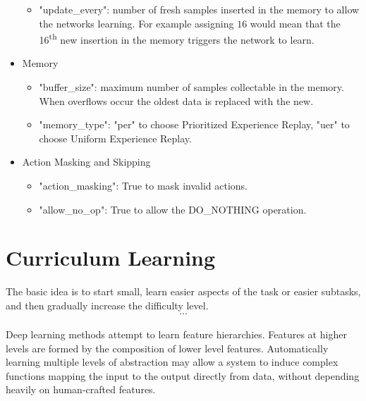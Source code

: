 \documentclass[11pt, a4paper, hidelinks]{report}
\begin{document}
\begin{itemize}
\begin{itemize}
		\item "update\_every": number of fresh samples inserted in the memory to allow the networks learning.
For example assigning $16$ would mean that the 16\textsuperscript{th} new insertion in the memory triggers the network to learn.
	\end{itemize}
	\item Memory
	\begin{itemize}
		\item "buffer\_size": maximum number of samples collectable in the memory.
When overflows occur the oldest data is replaced with the new.
		\item "memory\_type": "per" to choose Prioritized Experience Replay, "uer" to choose Uniform Experience Replay.
	\end{itemize}
	\item Action Masking and Skipping
	\begin{itemize}
		\item "action\_masking": True to mask invalid actions.
		\item "allow\_no\_op": True to allow the DO\_NOTHING operation.
	\end{itemize}
\end{itemize}

\section{Curriculum Learning}\label{sec:curriculum-learning}

\begin{quoting}[font=itshape, begintext={"}, endtext={"\citep{bengio-curiculum}}]
The basic idea is to start small, learn easier aspects of the task or easier subtasks, and then gradually increase the difficulty level.\\
\[\dots\]\\
Deep learning methods attempt to learn feature hierarchies.
Features at higher levels are formed by the composition of lower level features.
Automatically learning multiple levels of abstraction may allow a system to induce complex functions mapping the input to the output directly from data, without depending heavily on human-crafted features.
\end{quoting}
\end{document}
